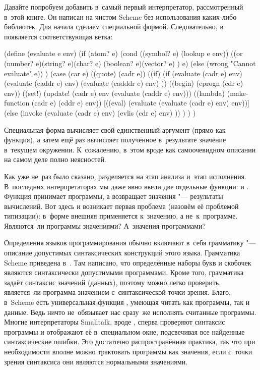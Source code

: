 Давайте попробуем добавить  в~самый первый интерпретатор, рассмотренный
в~этой книге.  Он написан на чистом Scheme
без использования каких-либо библиотек. Для начала сделаем  специальной
формой. Следовательно, в~ появляется соответствующая ветка:

\begin{code:lisp}
(define (evaluate e env)
  (if (atom? e)
      (cond ((symbol? e) (lookup e env))
            ((or (number? e)(string? e)(char? e)
                 (boolean? e)(vector? e) )
              e)
            (else (wrong "Cannot evaluate" e)) )
      (case (car e)
        ((quote) (cadr e))
        ((if)     (if (evaluate (cadr e) env)
                      (evaluate (caddr e) env)
                      (evaluate (cadddr e) env) ))
        ((begin)  (eprogn (cdr e) env))
        ((set!)   (update! (cadr e) env (evaluate (caddr e) env)))
        ((lambda) (make-function (cadr e) (cddr e) env))
        [((eval)   (evaluate (evaluate (cadr e) env) env))]
        (else     (invoke (evaluate (cadr e) env)
                          (evlis (cdr e) env) )) ) ) )
\end{code:lisp}

Специальная форма  вычисляет свой единственный аргумент (прямо как
функция), а затем ещё раз вычисляет полученное в~результате значение в~текущем
окружении. К~сожалению, в~этом вроде как самоочевидном описании на самом деле
полно неясностей.

Как уже не~раз было сказано,  разделяется на этап анализа и~этап
исполнения. В~последних интерпретаторах мы даже явно ввели две отдельные
функции:  и . Функция  принимает программы, а
возвращает значения "--- результаты вычислений. Вот здесь и возникает первая
проблема (назовём её проблемой типизации): в~форме  внешняя  применяется к~значению, а не~к~программе.
Являются~ли программы значениями? А~значения программами?

Определения языков программирования обычно включают в~себя грамматику "---
описание допустимых синтаксических конструкций этого языка. Грамматика Scheme
приведена в~\cite{kcr98}. Там написано, что определённые наборы букв и скобочек
являются синтаксически допустимыми программами. Кроме того, грамматика задаёт
синтаксис значений (данных), поэтому можно легко проверить, является~ли
программа значением с~синтаксической точки зрения. Благо, в~Scheme есть
универсальная функция , умеющая читать как программы, так и данные.
Ведь ничто не~обязывает нас сразу~же исполнять считанные  программы.
Многие интерпретаторы Smalltalk, вроде \cite{gr83}, сперва проверяют синтаксис
программы и отображают её в~специальном окне, подсвечивая все найденные
синтаксические ошибки. Это достаточно распространённая практика, так что при
необходимости вполне можно трактовать программы как значения, если с~точки
зрения синтаксиса они являются нормальными значениями.

